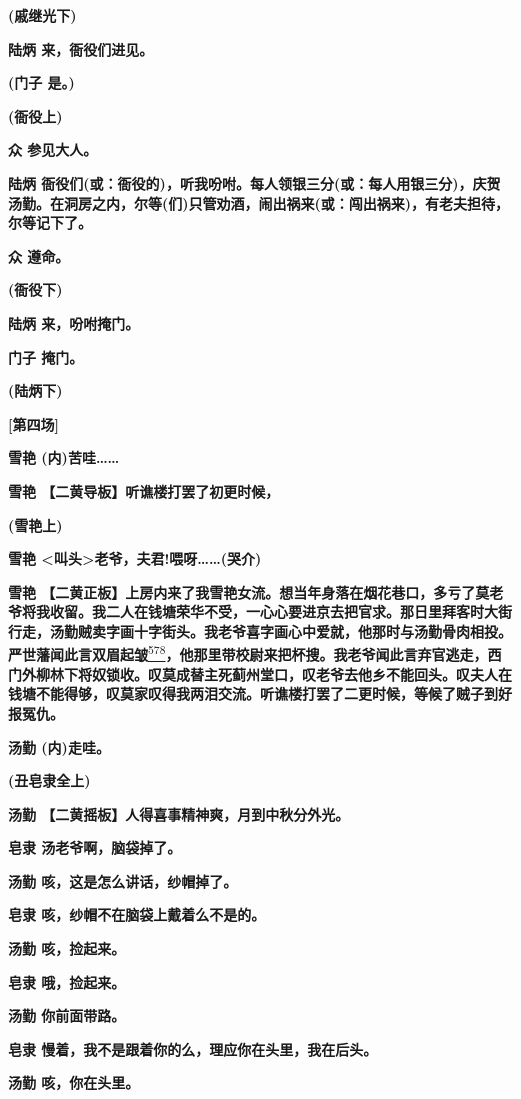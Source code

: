 \textbf{(戚继光下)}

\textbf{陆炳 来，衙役们进见。}

\textbf{(门子 是。)}

\textbf{(衙役上)}

\textbf{众 参见大人。}

\textbf{陆炳
衙役们(或：衙役的)，听我吩咐。每人领银三分(或：每人用银三分)，庆贺汤勤。在洞房之内，尔等(们)只管劝酒，闹出祸来(或：闯出祸来)，有老夫担待，尔等记下了。}

\textbf{众 遵命。}

\textbf{(衙役下)}

\textbf{陆炳 来，吩咐掩门。}

\textbf{门子 掩门。}

\textbf{(陆炳下)}

\textbf{{[}第四场{]}}

\textbf{雪艳 (内)苦哇\ldots{}\ldots{}}

\textbf{雪艳 【二黄导板】听谯楼打罢了初更时候，}

\textbf{(雪艳上)}

\textbf{雪艳
\textless{}叫头\textgreater{}老爷，夫君!喂呀\ldots{}\ldots{}(哭介)}

\textbf{雪艳
【二黄正板】上房内来了我雪艳女流。想当年身落在烟花巷口，多亏了莫老爷将我收留。我二人在钱塘荣华不受，一心心要进京去把官求。那日里拜客时大街行走，汤勤贼卖字画十字街头。我老爷喜字画心中爱就，他那时与汤勤骨肉相投。严世藩闻此言双眉起皱}\protect\hyperlink{fn578}{\textsuperscript{578}}\textbf{，他那里带校尉来把杯搜。我老爷闻此言弃官逃走，西门外柳林下将奴锁收。叹莫成替主死蓟州堂口，叹老爷去他乡不能回头。叹夫人在钱塘不能得够，叹莫家叹得我两泪交流。听谯楼打罢了二更时候，等候了贼子到好报冤仇。}

\textbf{汤勤 (内)走哇。}

\textbf{(丑皂隶全上)}

\textbf{汤勤 【二黄摇板】人得喜事精神爽，月到中秋分外光。}

\textbf{皂隶 汤老爷啊，脑袋掉了。}

\textbf{汤勤 咳，这是怎么讲话，纱帽掉了。}

\textbf{皂隶 咳，纱帽不在脑袋上戴着么不是的。}

\textbf{汤勤 咳，捡起来。}

\textbf{皂隶 哦，捡起来。}

\textbf{汤勤 你前面带路。}

\textbf{皂隶 慢着，我不是跟着你的么，理应你在头里，我在后头。}

\textbf{汤勤 咳，你在头里。}

